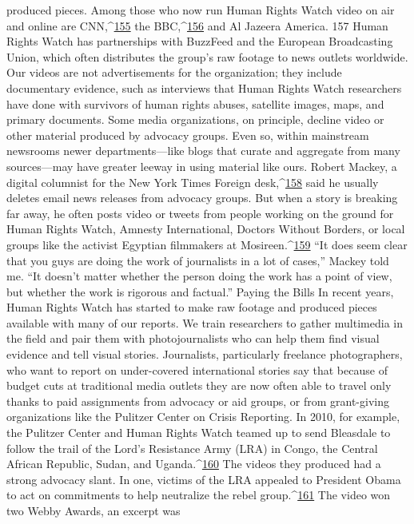 produced pieces. Among those who now run Human Rights Watch video on air and
online are CNN,^{\href{#endnotes}{155}} the BBC,^{\href{#endnotes}{156}} and Al Jazeera America. 157 Human Rights Watch has
partnerships with BuzzFeed and the European Broadcasting Union, which often
distributes the group’s raw footage to news outlets worldwide. Our videos are not
advertisements for the organization; they include documentary evidence, such as
interviews that Human Rights Watch researchers have done with survivors of human
rights abuses, satellite images, maps, and primary documents. Some media organizations,
on principle, decline video or other material produced by advocacy groups. Even so,
within mainstream newsrooms newer departments—like blogs that curate and aggregate
from many sources—may have greater leeway in using material like ours.
Robert Mackey, a digital columnist for the New York Times Foreign desk,^{\href{#endnotes}{158}} said he
usually deletes email news releases from advocacy groups. But when a story is breaking
far away, he often posts video or tweets from people working on the ground for Human
Rights Watch, Amnesty International, Doctors Without Borders, or local groups like the
activist Egyptian filmmakers at Mosireen.^{\href{#endnotes}{159}} ``It does seem clear that you guys are doing
the work of journalists in a lot of cases,'' Mackey told me. ``It doesn’t matter whether the
person doing the work has a point of view, but whether the work is rigorous and factual.''
Paying the Bills
In recent years, Human Rights Watch has started to make raw footage and produced
pieces available with many of our reports. We train researchers to gather multimedia in
the field and pair them with photojournalists who can help them find visual evidence and
tell visual stories.
Journalists, particularly freelance photographers, who want to report on under-covered
international stories say that because of budget cuts at traditional media outlets they are
now often able to travel only thanks to paid assignments from advocacy or aid groups, or
from grant-giving organizations like the Pulitzer Center on Crisis Reporting. In 2010, for
example, the Pulitzer Center and Human Rights Watch teamed up to send Bleasdale to
follow the trail of the Lord’s Resistance Army (LRA) in Congo, the Central African
Republic, Sudan, and Uganda.^{\href{#endnotes}{160}} The videos they produced had a strong advocacy slant.
In one, victims of the LRA appealed to President Obama to act on commitments to help
neutralize the rebel group.^{\href{#endnotes}{161}} The video won two Webby Awards, an excerpt was
